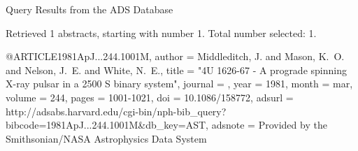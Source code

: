 Query Results from the ADS Database


Retrieved 1 abstracts, starting with number 1.  Total number selected: 1.

@ARTICLE{1981ApJ...244.1001M,
   author = {{Middleditch}, J. and {Mason}, K.~O. and {Nelson}, J.~E. and 
	{White}, N.~E.},
    title = "{4U 1626-67 - A prograde spinning X-ray pulsar in a 2500 S binary system}",
  journal = {\apj},
     year = 1981,
    month = mar,
   volume = 244,
    pages = {1001-1021},
      doi = {10.1086/158772},
   adsurl = {http://adsabs.harvard.edu/cgi-bin/nph-bib_query?bibcode=1981ApJ...244.1001M&db_key=AST},
  adsnote = {Provided by the Smithsonian/NASA Astrophysics Data System}
}


